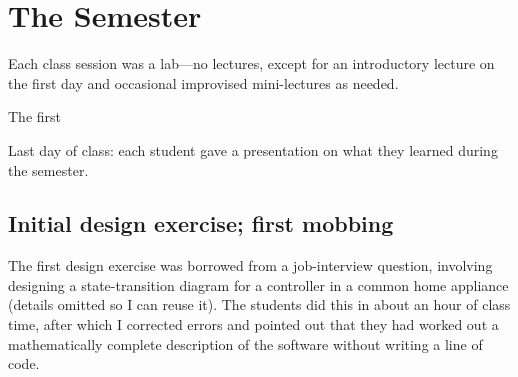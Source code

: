 \documentclass{article}
\begin{document}
\section{The Semester}

\begin{comment}
Three problems were evident before the semester began.

First, what is software design, anyway? The term is highly ambiguous.
Different experts hold radically different conceptions, from
James Reeves' view that ``the source code is the
design''\cite{reeves1992software} to IEEE~1016--2009, which specifies
12~``design viewpoints'', each with its own design entities, design
relationships, and design attributes, to be described in a design language
such as UML\cite{IEEE1016-2009}. The number of aspects or elements of software
design is mind-boggling, and each comes with its own opinionated camps and
controversies: high-level design, low-level design, system design, interface
design (which can mean user-interface design, interaction design,
communication protocols, or class method signatures, depending on who's
talking), database design, architectural design, GoF design patterns, ways of
organizing source code into subroutines, and more.

The sea of ambiguity and opinion surrounding ``software design''

Solution: I took the union of all theories of design, and announced on
the first day that the entire field of software design is a matter of
opinion (including this very statement). %


\end{comment}

Each class session was a lab---no lectures, except for an introductory lecture
on the first day and occasional improvised mini-lectures as needed.

The first 

Last day of class: each student gave a presentation on what they learned
during the semester.

\subsection{Initial design exercise; first mobbing}

The first design exercise was borrowed from a job-interview question,
involving designing a state-transition diagram for a controller in a common
home appliance (details omitted so I can reuse it). The students did this in
about an hour of class time, after which I corrected errors and pointed out
that they had worked out a mathematically complete description of the software
without writing a line of code.
\end{document}
